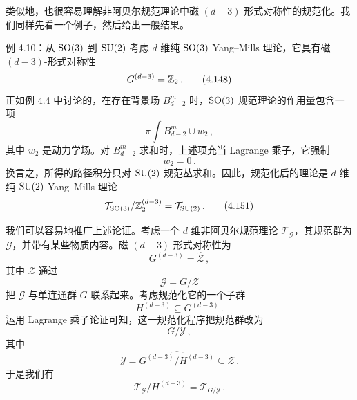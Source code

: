 类似地，也很容易理解非阿贝尔规范理论中磁 $(d-3)$-形式对称性的规范化。我们同样先看一个例子，然后给出一般结果。

\begin{examplebox}{例 4.10：从 $\mathrm{SO}(3)$ 到 $\mathrm{SU}(2)$}
考虑 $d$ 维纯 $\mathrm{SO}(3)$ Yang--Mills 理论，它具有磁 $(d-3)$-形式对称性
\begin{equation}
G^{(d-3)}=\mathbb{Z}_2\,.
\tag{4.148}
\end{equation}
正如例 4.4 中讨论的，在存在背景场 $B^m_{d-2}$ 时，$\mathrm{SO}(3)$ 规范理论的作用量包含一项
\begin{equation}
\pi\int B^m_{d-2}\cup w_2\,,
\tag{4.149}
\end{equation}
其中 $w_2$ 是动力学场。对 $B^m_{d-2}$ 求和时，上述项充当 Lagrange 乘子，它强制
\begin{equation}
w_2=0\,.
\tag{4.150}
\end{equation}
换言之，所得的路径积分只对 $\mathrm{SU}(2)$ 规范丛求和。因此，规范化后的理论是 $d$ 维纯 $\mathrm{SU}(2)$ Yang--Mills 理论
\begin{equation}
\mathcal{T}_{\mathrm{SO}(3)}/\mathbb{Z}_2^{(d-3)}=\mathcal{T}_{\mathrm{SU}(2)}\,.
\tag{4.151}
\end{equation}
\end{examplebox}

我们可以容易地推广上述论证。考虑一个 $d$ 维非阿贝尔规范理论 $\mathcal{T}_{\mathcal{G}}$，其规范群为 $\mathcal{G}$，并带有某些物质内容。磁 $(d-3)$-形式对称性为
\begin{equation}
G^{(d-3)}=\hat{\mathcal{Z}}\,,
\tag{4.152}
\end{equation}
其中 $\mathcal{Z}$ 通过
\begin{equation}
\mathcal{G}=G/\mathcal{Z}
\tag{4.153}
\end{equation}
把 $\mathcal{G}$ 与单连通群 $G$ 联系起来。考虑规范化它的一个子群
\begin{equation}
H^{(d-3)}\subseteq G^{(d-3)}\,.
\tag{4.154}
\end{equation}
运用 Lagrange 乘子论证可知，这一规范化程序把规范群改为
\begin{equation}
G/\mathcal{Y}\,,
\tag{4.155}
\end{equation}
其中
\begin{equation}
\mathcal{Y}=\widehat{G^{(d-3)}/H^{(d-3)}}\subseteq\mathcal{Z}\,.
\tag{4.156}
\end{equation}
于是我们有
\begin{equation}
\mathcal{T}_{\mathcal{G}}/H^{(d-3)}=\mathcal{T}_{G/\mathcal{Y}}\,.
\tag{4.157}
\end{equation}

